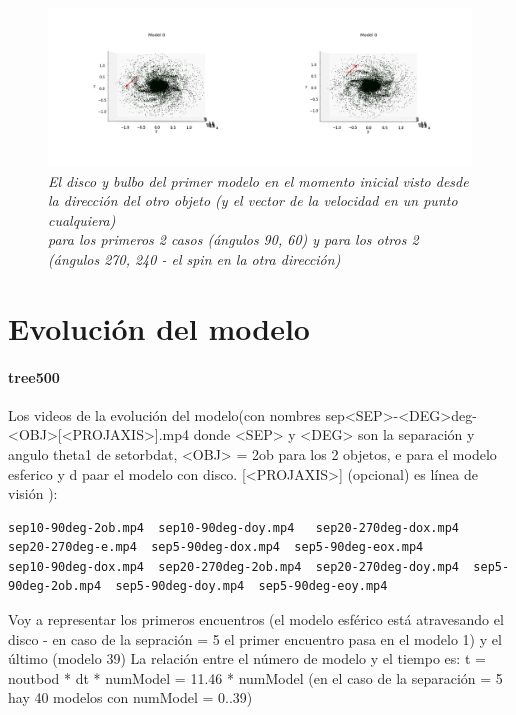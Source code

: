 \documentclass[12pt]{article} %
\renewcommand{\=}[1]{\stackrel{#1}{=}} %
\theoremstyle{definition}
\theoremstyle{remark}
\begin{document}
\begin{figure}[!ht]
 \centering
 \includegraphics[scale=0.2]{inimoddisco_sep5.png}
 \caption{\emph{El disco y bulbo del primer modelo en el momento inicial visto desde la dirección del otro objeto (y el vector de la velocidad en un punto cualquiera) \\
para los primeros 2 casos (ángulos 90, 60) y para los otros 2 (ángulos 270, 240 - el spin en la otra dirección)}}
\end{figure}





\newpage
\section*{Evolución del modelo}
\paragraph{tree500}

Los videos de la evolución del modelo(con nombres sep<SEP>-<DEG>deg-<OBJ>[<PROJAXIS>].mp4 donde <SEP> y <DEG> son la separación y angulo theta1 de setorbdat, <OBJ> = 2ob para los 2 objetos, e para el modelo esferico y d paar el modelo con disco. [<PROJAXIS>] (opcional) es línea de visión ):
\small
\begin{verbatim}
sep10-90deg-2ob.mp4  sep10-90deg-doy.mp4   sep20-270deg-dox.mp4  sep20-270deg-e.mp4  sep5-90deg-dox.mp4  sep5-90deg-eox.mp4
sep10-90deg-dox.mp4  sep20-270deg-2ob.mp4  sep20-270deg-doy.mp4  sep5-90deg-2ob.mp4  sep5-90deg-doy.mp4  sep5-90deg-eoy.mp4
\end{verbatim}

\normalsize



Voy a representar los primeros encuentros (el modelo esférico está atravesando el disco - en caso de la sepración = 5 el primer encuentro pasa en el modelo 1) y el último (modelo 39)
La relación entre el número de modelo y el tiempo es: t = noutbod * dt * numModel = 11.46 *  numModel
(en el caso de la separación = 5 hay 40 modelos con numModel = 0..39)
\end{document}
